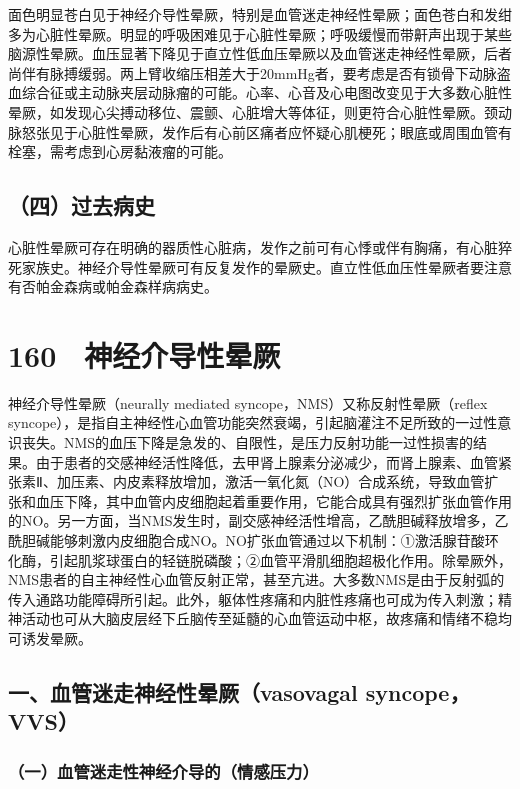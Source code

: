 面色明显苍白见于神经介导性晕厥，特别是血管迷走神经性晕厥；面色苍白和发绀多为心脏性晕厥。明显的呼吸困难见于心脏性晕厥；呼吸缓慢而带鼾声出现于某些脑源性晕厥。血压显著下降见于直立性低血压晕厥以及血管迷走神经性晕厥，后者尚伴有脉搏缓弱。两上臂收缩压相差大于20mmHg者，要考虑是否有锁骨下动脉盗血综合征或主动脉夹层动脉瘤的可能。心率、心音及心电图改变见于大多数心脏性晕厥，如发现心尖搏动移位、震颤、心脏增大等体征，则更符合心脏性晕厥。颈动脉怒张见于心脏性晕厥，发作后有心前区痛者应怀疑心肌梗死；眼底或周围血管有栓塞，需考虑到心房黏液瘤的可能。

\subsection{（四）过去病史}

心脏性晕厥可存在明确的器质性心脏病，发作之前可有心悸或伴有胸痛，有心脏猝死家族史。神经介导性晕厥可有反复发作的晕厥史。直立性低血压性晕厥者要注意有否帕金森病或帕金森样病病史。

\protect\hypertarget{text00365.html}{}{}

\section{160　神经介导性晕厥}

神经介导性晕厥（neurally mediated syncope，NMS）又称反射性晕厥（reflex
syncope），是指自主神经性心血管功能突然衰竭，引起脑灌注不足所致的一过性意识丧失。NMS的血压下降是急发的、自限性，是压力反射功能一过性损害的结果。由于患者的交感神经活性降低，去甲肾上腺素分泌减少，而肾上腺素、血管紧张素Ⅱ、加压素、内皮素释放增加，激活一氧化氮（NO）合成系统，导致血管扩张和血压下降，其中血管内皮细胞起着重要作用，它能合成具有强烈扩张血管作用的NO。另一方面，当NMS发生时，副交感神经活性增高，乙酰胆碱释放增多，乙酰胆碱能够刺激内皮细胞合成NO。NO扩张血管通过以下机制：①激活腺苷酸环化酶，引起肌浆球蛋白的轻链脱磷酸；②血管平滑肌细胞超极化作用。除晕厥外，NMS患者的自主神经性心血管反射正常，甚至亢进。大多数NMS是由于反射弧的传入通路功能障碍所引起。此外，躯体性疼痛和内脏性疼痛也可成为传入刺激；精神活动也可从大脑皮层经下丘脑传至延髓的心血管运动中枢，故疼痛和情绪不稳均可诱发晕厥。

\subsection{一、血管迷走神经性晕厥（vasovagal syncope，VVS）}

\subsubsection{（一）血管迷走性神经介导的（情感压力）}

